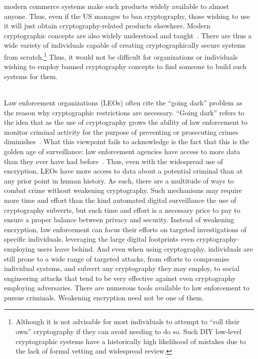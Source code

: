 \begin{packed_desc}
  modern commerce systems make such products widely available to
  almost anyone. Thus, even if the US manages to ban cryptography,
  those wishing to use it will just obtain cryptography-related
  products elsewhere. Modern cryptographic concepts are also widely
  understood and taught~\cite{schneier2010crypto}. There are thus a
  wide variety of individuals capable of creating cryptographically
  secure systems from scratch.\footnote{Although it is not advisable
    for most individuals to attempt to ``roll their own'' cryptography
    if they can avoid needing to do so. Such DIY low-level
    cryptographic systems have a historically high likelihood of
    mistakes due to the lack of formal vetting and widespread review.}
  Thus, it would not be difficult for organizations or individuals
  wishing to employ banned cryptography concepts to find someone
  to build such systems for them.
\item[Better Options] \hfill \\ Law enforcement organizations (LEOs)
  often cite the ``going dark'' problem as the reason why
  cryptographic restrictions are necessary. ``Going dark'' refers to
  the idea that as the use of cryptography grows the ability of law
  enforcement to monitor criminal activity for the purpose of
  preventing or prosecuting crimes
  diminishes~\cite{anderson2013}. What this viewpoint fails to
  acknowledge is the fact that this is the golden age of surveillance:
  law enforcement agencies have access to more data than they ever
  have had before~\cite{swire2011}. Thus, even with the widespread use
  of encryption, LEOs have more access to data about a potential
  criminal than at any prior point in human history. As such, there
  are a multitude of ways to combat crime without weakening
  cryptography. Such mechanisms may require more time and effort than
  the kind automated digital surveillance the use of cryptography
  subverts, but such time and effort is a necessary price to pay to
  ensure a proper balance between privacy and security. Instead of
  weakening encryption, law enforcement can focus their efforts on
  targeted investigations of specific individuals, leveraging the
  large digital footprints even cryptography-employing users leave
  behind. And even when using cryptography, individuals are still
  prone to a wide range of targeted attacks, from efforts to
  compromise individual systems, and subvert any cryptography they may
  employ, to social engineering attacks that tend to be very effective
  against even cryptography employing adversaries. There are numerous
  tools available to law enforcement to pursue criminals. Weakening
  encryption need not be one of them.
\end{packed_desc}

